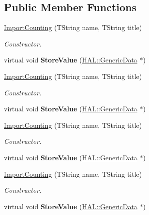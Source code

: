 \subsection*{Public Member Functions}
\begin{DoxyCompactItemize}
\item 
\hyperlink{class_h_a_l_1_1_algorithms_1_1_import_counting_a533c67ebac3fbcb71c800ccb794bdf24}{Import\+Counting} (T\+String name, T\+String title)
\begin{DoxyCompactList}\small\item\em Constructor. \end{DoxyCompactList}\item 
\hypertarget{class_h_a_l_1_1_algorithms_1_1_import_counting_a5c11aa12b91c4fbe66a76d4acbfd0033}{virtual void {\bfseries Store\+Value} (\hyperlink{class_h_a_l_1_1_generic_data}{H\+A\+L\+::\+Generic\+Data} $\ast$)}\label{class_h_a_l_1_1_algorithms_1_1_import_counting_a5c11aa12b91c4fbe66a76d4acbfd0033}

\item 
\hyperlink{class_h_a_l_1_1_algorithms_1_1_import_counting_a533c67ebac3fbcb71c800ccb794bdf24}{Import\+Counting} (T\+String name, T\+String title)
\begin{DoxyCompactList}\small\item\em Constructor. \end{DoxyCompactList}\item 
\hypertarget{class_h_a_l_1_1_algorithms_1_1_import_counting_a5c11aa12b91c4fbe66a76d4acbfd0033}{virtual void {\bfseries Store\+Value} (\hyperlink{class_h_a_l_1_1_generic_data}{H\+A\+L\+::\+Generic\+Data} $\ast$)}\label{class_h_a_l_1_1_algorithms_1_1_import_counting_a5c11aa12b91c4fbe66a76d4acbfd0033}

\item 
\hyperlink{class_h_a_l_1_1_algorithms_1_1_import_counting_a533c67ebac3fbcb71c800ccb794bdf24}{Import\+Counting} (T\+String name, T\+String title)
\begin{DoxyCompactList}\small\item\em Constructor. \end{DoxyCompactList}\item 
\hypertarget{class_h_a_l_1_1_algorithms_1_1_import_counting_a5c11aa12b91c4fbe66a76d4acbfd0033}{virtual void {\bfseries Store\+Value} (\hyperlink{class_h_a_l_1_1_generic_data}{H\+A\+L\+::\+Generic\+Data} $\ast$)}\label{class_h_a_l_1_1_algorithms_1_1_import_counting_a5c11aa12b91c4fbe66a76d4acbfd0033}

\item 
\hyperlink{class_h_a_l_1_1_algorithms_1_1_import_counting_a533c67ebac3fbcb71c800ccb794bdf24}{Import\+Counting} (T\+String name, T\+String title)
\begin{DoxyCompactList}\small\item\em Constructor. \end{DoxyCompactList}\item 
\hypertarget{class_h_a_l_1_1_algorithms_1_1_import_counting_a5c11aa12b91c4fbe66a76d4acbfd0033}{virtual void {\bfseries Store\+Value} (\hyperlink{class_h_a_l_1_1_generic_data}{H\+A\+L\+::\+Generic\+Data} $\ast$)}\label{class_h_a_l_1_1_algorithms_1_1_import_counting_a5c11aa12b91c4fbe66a76d4acbfd0033}


\end{DoxyCompactItemize}
